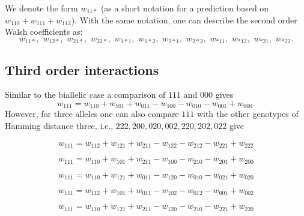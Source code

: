 \documentclass[12pt]{amsart}
\theoremstyle{plain}
\theoremstyle{definition}
\begin{document}
We denote the form $w_{11\ast}$
(as a short notation for a prediction based on
$
w_{110} + w_{111} +w_{112}
$).
With the same notation, one can describe
the second order Walsh coefficients as:
\[
w_{11 \ast}, \, \,  w_{12\ast}, \, \, w_{21\ast}, \, \, w_{22 \ast}, \, \,
w_{1 \ast 1}, \,  \, w_{1 \ast 2},  \,  \, w_{2 \ast 1},  \, \,   w_{2 \ast 2}, \, \,
w_{\ast 11},  \, \,   w_{\ast 12},  \, \,   w_{\ast 21},   \, \, w_{\ast 22}.
\]




\subsection{Third order interactions}
Similar to the biallelic case
a comparison of $111$ and $000$
gives 
\begin{equation}
w_{111}=w_{110}+w_{101}+w_{011}-w_{100}-w_{010}-w_{001}+w_{000}.
\end{equation}
However, for three alleles one can also compare $111$ with the other genotypes of Hamming distance
three, i.e.,  $222, 200, 020, 002, 220, 202, 022$ give 


\begin{equation}
 w_{111}=w_{112}+w_{121}+w_{211}-w_{122}-w_{212}-w_{221}+w_{222}
\end{equation}





\begin{equation}
w_{111}=w_{110}+w_{101}+w_{211}-w_{100}-w_{210}-w_{201}+w_{200}
\end{equation}





\begin{equation}
w_{111}=w_{110}+w_{121}+w_{011}-w_{120}-w_{010}-w_{021}+w_{020}
\end{equation}





\begin{equation}
w_{111}=w_{112}+w_{101}+w_{011}-w_{102}-w_{012}-w_{001}+w_{002}
\end{equation}






\begin{equation}
w_{111}=w_{110}+w_{121}+w_{211}-w_{120}-w_{210}-w_{221}+w_{220}
\end{equation}
\end{document}
